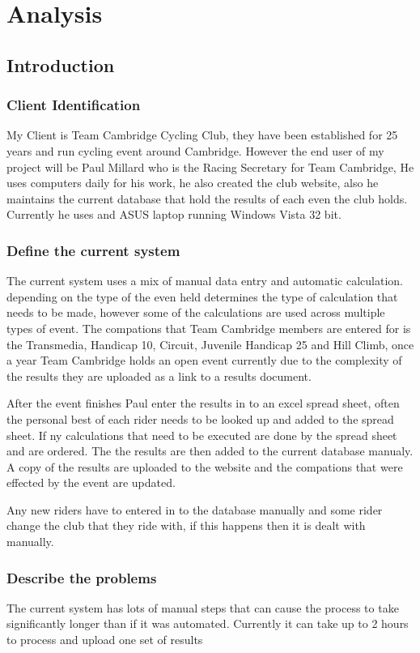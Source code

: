 \chapter{Analysis}

\section{Introduction}

\subsection{Client Identification}
My Client is Team Cambridge Cycling Club, they have been established for 25 years and run cycling event around Cambridge. However the end user of my project will be Paul Millard who is the Racing Secretary for Team Cambridge, He uses computers daily for his work, he also created the club website, also he maintains the current database that hold the results of each even the club holds. Currently he uses and ASUS laptop running Windows Vista 32 bit.
\subsection{Define the current system}
The current system uses a mix of manual data entry and automatic calculation. depending on the type of the even held determines the type of calculation that needs to be made, however some of the calculations are used across multiple types of event. The compations that Team Cambridge members are entered for is the Transmedia, Handicap 10, Circuit, Juvenile Handicap 25 and Hill Climb, once a year Team Cambridge holds an open event currently due to the complexity of the results they are uploaded as a link to a  results document. 

After the event finishes Paul enter the results in to an excel spread sheet, often the personal best of each rider needs to be looked up and added to the spread sheet. If ny calculations that need to be executed are done by the spread sheet and are ordered. The the results are then added to the current database manualy. A copy of the results are uploaded to the website and the compations that were effected by the event are updated.

Any new riders have to entered in to the database manually and some rider change the club that they ride with, if this happens then it is dealt with manually.
\subsection{Describe the problems}
The current system has lots of manual steps that can cause the process to take significantly longer than if it was automated. Currently it can take up to 2 hours to process and upload one set of results

